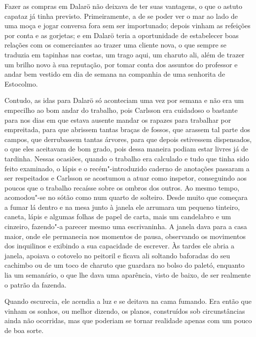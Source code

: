 Fazer as compras em Dalarö não deixava de ter suas vantagens, o que o astuto
capataz já tinha previsto. Primeiramente, a de se poder ver o mar ao lado de uma
moça e jogar conversa fora sem ser importunado; depois vinham as refeições por
conta e as gorjetas; e em Dalarö teria a oportunidade de estabelecer boas
relações com os comerciantes ao trazer uma cliente nova, o que sempre se traduzia
em tapinhas nas costas, um trago aqui, um charuto ali, além de trazer um brilho
novo à sua reputação, por tomar conta dos assuntos do professor e andar bem
vestido em dia de semana na companhia de uma senhorita de Estocolmo.

Contudo, as idas para Dalarö só aconteciam uma vez por semana e não era um
empecilho ao bom andar do trabalho, pois Carlsson era cuidadoso o bastante para
nos dias em que estava ausente mandar os rapazes para trabalhar por empreitada,
para que abrissem tantas braças de fossos, que arassem tal parte dos campos, que
derrubassem tantas árvores, para que depois estivessem dispensados, o que eles
aceitavam de bom grado, pois dessa maneira podiam estar livres já de tardinha.
Nessas ocasiões, quando o trabalho era calculado e tudo que tinha sido feito
examinado, o lápis e o recém"-introduzido caderno de anotações passaram a ser
respeitados e Carlsson se acostumou a atuar como inspetor, conseguindo
aos poucos que o trabalho recaísse sobre os ombros dos outros. Ao mesmo tempo,
acomodou"-se no sótão como num quarto de solteiro. Desde muito que começara a
fumar lá dentro e na mesa junto à janela ele arrumara um pequeno tinteiro,
caneta, lápis e algumas folhas de papel de carta, mais um candelabro e um
cinzeiro, fazendo"-a parecer mesmo uma escrivaninha. A janela dava para a casa maior,
onde ele permanecia nos momentos de pausa, observando os movimentos dos
inquilinos e exibindo a sua capacidade de escrever. Às tardes ele abria a
janela, apoiava o cotovelo no peitoril e ficava ali soltando baforadas do seu
cachimbo ou de um toco de charuto que guardara no bolso do paletó, enquanto lia
um semanário, o que lhe dava uma aparência, visto de baixo, de ser realmente o
patrão da fazenda.

Quando escurecia, ele acendia a luz e se deitava na cama fumando. Era então que
vinham os sonhos, ou melhor dizendo, os planos, construídos sob circunstâncias
ainda não ocorridas, mas que poderiam se tornar realidade apenas com um pouco de
boa sorte.

